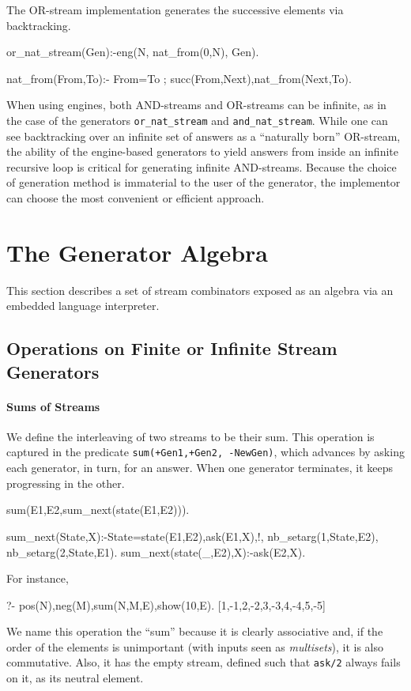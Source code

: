 \documentclass[submission,copyright,creativecommons]{eptcs}
\begin{document}
The OR-stream implementation generates the successive elements via backtracking.
\begin{code}
or_nat_stream(Gen):-eng(N, nat_from(0,N), Gen).

nat_from(From,To):- From=To ; succ(From,Next),nat_from(Next,To).
\end{code}

When using engines, 
both AND-streams and OR-streams can be infinite, as in the
case of the generators {\tt or\_nat\_stream} and {\tt and\_nat\_stream}.
While one can see backtracking over an infinite set of answers as
a ``naturally born'' OR-stream, the ability of the engine-based  generators to
yield answers from inside an infinite recursive loop is critical
for generating infinite AND-streams.
Because the choice of generation method is immaterial to the user of the generator,
the implementor can choose the most convenient or efficient approach.

\section{The Generator Algebra}\label{alg}

This section describes a set of stream combinators exposed as an algebra via an
embedded language interpreter.
 
\subsection{Operations on Finite or Infinite Stream Generators}

\paragraph{Sums of Streams}

We define the interleaving of two streams to be their sum. This operation is
captured in the predicate {\tt sum(+Gen1,+Gen2, -NewGen)}, which advances by
asking each generator, in turn, for an answer. When one generator terminates,
it keeps progressing in the other.
\begin{code}
sum(E1,E2,sum_next(state(E1,E2))).

sum_next(State,X):-State=state(E1,E2),ask(E1,X),!,
  nb_setarg(1,State,E2),
  nb_setarg(2,State,E1).
sum_next(state(_,E2),X):-ask(E2,X).
\end{code}
For instance,
\begin{codex}
?- pos(N),neg(M),sum(N,M,E),show(10,E).
[1,-1,2,-2,3,-3,4,-4,5,-5]
\end{codex}
We name this operation the ``sum'' because it is clearly associative and, if the
order of the elements is unimportant (with inputs seen as {\em multisets}), it is also commutative.
 Also, it has
the empty stream, defined such that {\tt ask/2} always fails on it, as its neutral element.
\end{document}
